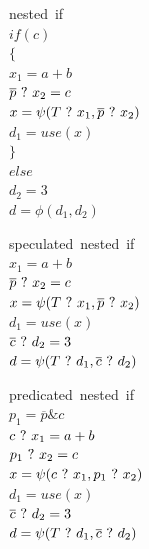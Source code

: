 \begin{figure}
\footnotesize
\begin{minipage}[b]{4cm}
\mbox{nested if} \\
$ if (c) $ \\
$ \{ $ \\
\hspace*{2mm}$ x_1 = a + b $ \\
\hspace*{2mm}$ \overline{p} ~?~ x_2 = c $ \\
\hspace*{2mm}$ x = \psi(T ~?~ x_1, \overline{p} ~?~ x_2) $ \\
\hspace*{2mm}$ d_1 = use (x) $ \\
$ \} $ \\
$ else $ \\
\hspace*{2mm}$ d_2 = 3 $ \\
$ d = \phi(d_1,d_2) $ \\
\label{fig:nested_psi}
\end{minipage}
\begin{minipage}[b]{4cm}
\mbox{speculated nested if} \\
$ x_1 = a + b $ \\
$ \overline{p} ~?~ x_2 = c $ \\
$ x = \psi(T ~?~ x_1, \overline{p} ~?~ x_2) $ \\
$ d_1 = use (x) $ \\
$ \overline{c} ~?~ d_2 = 3 $ \\
$ d = \psi(T ~?~ d_1, \overline{c} ~?~ d_2) $ \\
\label{fig:nested_psi_speculated}
\end{minipage}
\begin{minipage}[b]{4cm}
\mbox{predicated nested if} \\
$ p_1 = \overline{p} \& {c} $ \\
$ c ~?~ x_1 = a + b $ \\
$ p_1 ~?~ x_2 = c $ \\
$ x = \psi(c ~?~ x_1, p_1 ~?~ x_2) $ \\
$ d_1 = use (x) $ \\
$ \overline{c} ~?~ d_2 = 3 $ \\
$ d = \psi(T ~?~ d_1, \overline{c} ~?~ d_2) $ \\
\label{fig:nested_psi_predicated}
\end{minipage}
\end{figure}

